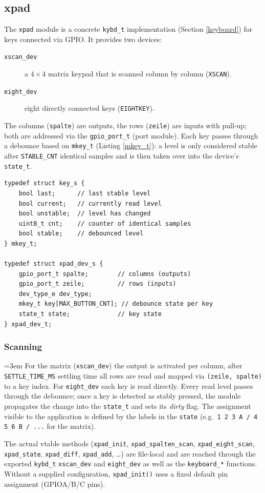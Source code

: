 \subsection{xpad}\label{xpad}
The \verb|xpad| module is a concrete \verb|kybd_t| implementation (Section
\ref{keyboard}) for keys connected via GPIO. It provides two devices:
\begin{description}
\item[\texttt{xscan\_dev}] a $4\times4$ matrix keypad that is scanned column by
  column (\verb|XSCAN|).
\item[\texttt{eight\_dev}] eight directly connected keys (\verb|EIGHTKEY|).
\end{description}
The columns (\verb|spalte|) are outputs, the rows (\verb|zeile|) are inputs
with pull-up; both are addressed via the \verb|gpio_port_t| (port module). Each
key passes through a debounce based on \verb|mkey_t| (Listing \ref{mkey_t}): a
level is only considered stable after \verb|STABLE_CNT| identical samples and
is then taken over into the device's \verb|state_t|.

\begin{listing}
\begin{verbatim}
typedef struct key_s {
    bool last;      // last stable level
    bool current;   // currently read level
    bool unstable;  // level has changed
    uint8_t cnt;    // counter of identical samples
    bool stable;    // debounced level
} mkey_t;

typedef struct xpad_dev_s {
    gpio_port_t spalte;        // columns (outputs)
    gpio_port_t zeile;         // rows (inputs)
    dev_type_e dev_type;
    mkey_t key[MAX_BUTTON_CNT]; // debounce state per key
    state_t state;             // key state
} xpad_dev_t;
\end{verbatim}
\caption{Debounce and device structure \texttt{mkey\_t} / \texttt{xpad\_dev\_t}}
\label{mkey_t}
\end{listing}

\subsubsection*{Scanning}
{\sloppy\emergencystretch=3em
For the matrix (\verb|xscan_dev|) the output is activated per column, after
\verb|SETTLE_TIME_MS| settling time all rows are read and mapped via
\verb|(zeile, spalte)| to a key index. For \verb|eight_dev| each key is read
directly. Every read level passes through the debounce; once a key is detected
as stably pressed, the module propagates the change into the \verb|state_t| and
sets its \emph{dirty} flag. The assignment visible to the application is
defined by the labels in the \verb|state| (e.g.\ \verb|1 2 3 A / 4 5 6 B / ...|
for the matrix).
\par}

\noindent The actual vtable methods (\verb|xpad_init|,
\verb|xpad_spalten_scan|, \verb|xpad_eight_scan|, \verb|xpad_state|,
\verb|xpad_diff|, \verb|xpad_add|, \dots) are file-local and are reached
through the exported \verb|kybd_t| \verb|xscan_dev| and \verb|eight_dev| as
well as the \verb|keyboard_*| functions. Without a supplied configuration,
\verb|xpad_init()| uses a fixed default pin assignment (GPIOA/B/C pins).
